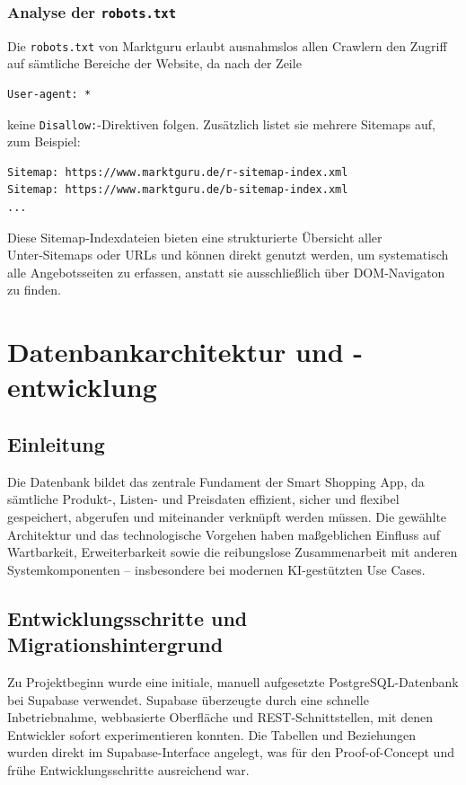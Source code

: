 \documentclass[12pt, a4paper]{report} %
\newcommand{\authorinitials}{} %
\begin{document}
\subsection{Analyse der \texttt{robots.txt}}
Die \texttt{robots.txt} von Marktguru erlaubt ausnahmslos allen Crawlern den Zugriff auf sämtliche Bereiche der Website, da nach der Zeile
\begin{verbatim}
User-agent: *
\end{verbatim}
keine \texttt{Disallow:}-Direktiven folgen. Zusätzlich listet sie mehrere Sitemaps auf, zum Beispiel:
\begin{verbatim}
Sitemap: https://www.marktguru.de/r-sitemap-index.xml
Sitemap: https://www.marktguru.de/b-sitemap-index.xml
...
\end{verbatim}
Diese Sitemap‑Indexdateien bieten eine strukturierte Übersicht aller Unter‑Sitemaps oder URLs und können direkt genutzt werden, um systematisch alle Angebotsseiten zu erfassen, anstatt sie ausschließlich über DOM‑Navigaton zu finden.


\cleardoublepage


\chapter{Datenbankarchitektur und -entwicklung}
\renewcommand{\authorinitials}{MK}

\section{Einleitung}

Die Datenbank bildet das zentrale Fundament der Smart Shopping App, da sämtliche Produkt-, Listen- und Preisdaten effizient, sicher und flexibel gespeichert, abgerufen und miteinander verknüpft werden müssen. Die gewählte Architektur und das technologische Vorgehen haben maßgeblichen Einfluss auf Wartbarkeit, Erweiterbarkeit sowie die reibungslose Zusammenarbeit mit anderen Systemkomponenten – insbesondere bei modernen KI-gestützten Use Cases.

\section{Entwicklungsschritte und Migrationshintergrund}

Zu Projektbeginn wurde eine initiale, manuell aufgesetzte PostgreSQL-Datenbank bei Supabase verwendet. Supabase überzeugte durch eine schnelle Inbetriebnahme, webbasierte Oberfläche und REST-Schnittstellen, mit denen Entwickler sofort experimentieren konnten. Die Tabellen und Beziehungen wurden direkt im Supabase-Interface angelegt, was für den Proof-of-Concept und frühe Entwicklungsschritte ausreichend war.
\end{document}
